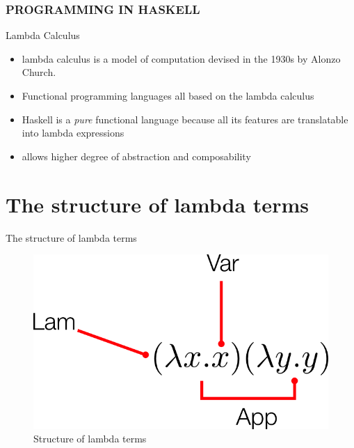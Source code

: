 \documentclass{beamer}
\begin{document}
\begin{frame}       
    \frametitle{PROGRAMMING IN HASKELL}
    \begin{figure}
    \end{figure}

\end{frame}

\begin{frame}{Lambda Calculus}
    \begin{itemize}
        \item lambda calculus is  a model of computation devised in the 1930s by Alonzo Church.
        \item Functional programming languages all based on the lambda calculus
        \item Haskell is a \textit{pure} functional language because all its features are translatable into lambda expressions
        \item allows higher degree of abstraction and composability
        \end{itemize}
        
         
\end{frame}
\section{The structure of lambda terms}
\begin{frame}{The structure of lambda terms}
\begin{figure} [H]
	\centering
	\includegraphics[width=.6\textwidth]{img/01.png}
	\caption{Structure of lambda terms}
	\label{fig:funcapp}
\end{figure}  
\end{frame}
\end{document}

